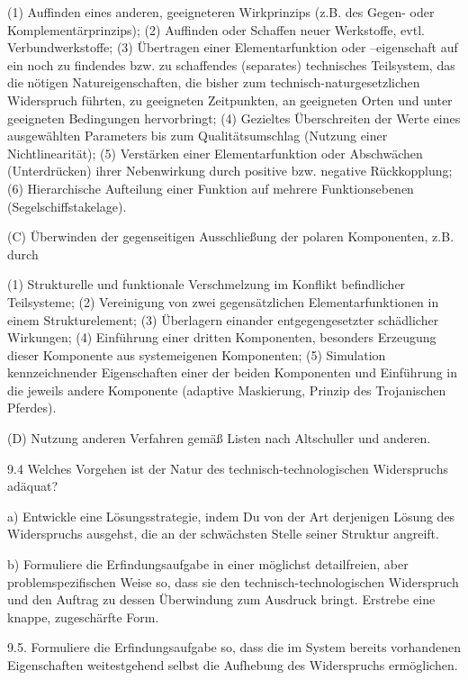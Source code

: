 \documentclass[12pt,a4paper]{article}
\begin{document}
    (1) Auffinden eines anderen, geeigneteren Wirkprinzips (z.B. des Gegen- oder Komplementärprinzips);
    (2) Auffinden oder Schaffen neuer Werkstoffe, evtl. Verbundwerkstoffe;
    (3) Übertragen einer Elementarfunktion oder –eigenschaft auf ein noch zu findendes bzw. zu schaffendes (separates) technisches Teilsystem, das die nötigen Natureigenschaften, die bisher zum technisch-naturgesetzlichen Widerspruch führten, zu geeigneten Zeitpunkten, an geeigneten Orten und unter geeigneten Bedingungen hervorbringt;
    (4)  Gezieltes Überschreiten der Werte eines ausgewählten Parameters bis zum Qualitätsumschlag (Nutzung einer Nichtlinearität);
    (5)  Verstärken einer Elementarfunktion oder Abschwächen (Unterdrücken) ihrer Nebenwirkung durch positive bzw. negative Rückkopplung;
    (6)  Hierarchische Aufteilung einer Funktion auf mehrere Funktionsebenen (Segelschiffstakelage).


(C)   Überwinden der gegenseitigen Ausschließung der polaren Komponenten, z.B. durch

    (1)  Strukturelle und funktionale Verschmelzung im Konflikt befindlicher Teilsysteme;
    (2)  Vereinigung von zwei gegensätzlichen Elementarfunktionen in einem Strukturelement;
    (3)  Überlagern einander entgegengesetzter schädlicher Wirkungen;
    (4)  Einführung einer dritten Komponenten, besonders Erzeugung dieser Komponente aus systemeigenen Komponenten;
    (5)  Simulation kennzeichnender Eigenschaften einer der beiden Komponenten und Einführung in die jeweils andere Komponente (adaptive Maskierung, Prinzip des Trojanischen Pferdes).


(D)   Nutzung anderen Verfahren gemäß Listen nach Altschuller und anderen.


9.4    Welches Vorgehen ist der Natur des technisch-technologischen Widerspruchs adäquat?

    a) Entwickle eine Lösungsstrategie, indem Du von der Art derjenigen Lösung des Widerspruchs ausgehst, die an der schwächsten Stelle seiner Struktur angreift.

    b) Formuliere die Erfindungsaufgabe in einer möglichst detailfreien, aber problemspezifischen Weise so, dass sie den technisch-technologischen Widerspruch und den Auftrag zu dessen Überwindung zum Ausdruck bringt. Erstrebe eine knappe, zugeschärfte Form.


9.5.    Formuliere die Erfindungsaufgabe so, dass die im System bereits vorhandenen Eigenschaften weitestgehend selbst die Aufhebung des Widerspruchs ermöglichen.
\end{document}
